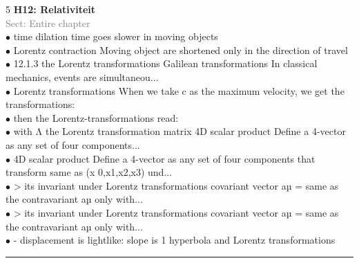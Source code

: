 \documentclass[7pt,a4paper]{article}
\begin{document}
\begin{multicols*}{5}
\textbf{H12: Relativiteit}\\\textcolor{gray}{{Sect: Entire chapter}}\\\vspace{0.5pt}
$\bullet$ time dilation time goes slower in moving objects\\
$\bullet$ Lorentz contraction Moving object are shortened only in the direction of travel\\
$\bullet$ 12.1.3 the Lorentz transformations 
Galilean transformations In classical mechanics, events are simultaneou...\\
$\bullet$ Lorentz transformations When we take c as the maximum velocity, we get the transformations:\\
$\bullet$ then the Lorentz-transformations read:\\
$\bullet$ with Λ the Lorentz transformation matrix 
4D scalar product Define a 4-vector as any set of four components...\\
$\bullet$ 4D scalar product Define a 4-vector as any set of four components that transform same as (x 0,x1,x2,x3) und...\\
$\bullet$ > its invariant under Lorentz transformations 
covariant vector aµ = same as the contravariant aµ only with...\\
$\bullet$ > its invariant under Lorentz transformations 
covariant vector aµ = same as the contravariant aµ only with...\\
$\bullet$ - displacement is lightlike: slope is 1 
hyperbola and Lorentz  
transformations\\
\columnbreak


\end{multicols*}

\vspace*{-3pt}
\hrule
\vspace*{2pt}
\end{document}
